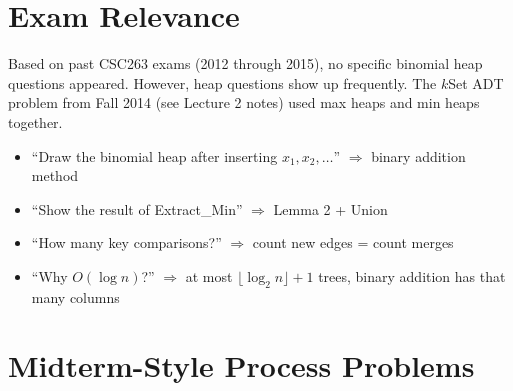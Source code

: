 \documentclass[11pt]{article}
\begin{document}
\section{Exam Relevance}

Based on past CSC263 exams (2012 through 2015), no specific binomial heap questions appeared. However, heap questions show up frequently. The $k$Set ADT problem from Fall 2014 (see Lecture 2 notes) used max heaps and min heaps together.

\begin{warnbox}
\begin{itemize}[leftmargin=1.4em,itemsep=2pt]
  \item ``Draw the binomial heap after inserting $x_1, x_2, \ldots$'' $\Rightarrow$ binary addition method
  \item ``Show the result of Extract\_Min'' $\Rightarrow$ Lemma 2 + Union
  \item ``How many key comparisons?'' $\Rightarrow$ count new edges = count merges
  \item ``Why $O(\log n)$?'' $\Rightarrow$ at most $\lfloor \log_2 n \rfloor + 1$ trees, binary addition has that many columns
\end{itemize}
\end{warnbox}

\section{Midterm-Style Process Problems}
\end{document}

